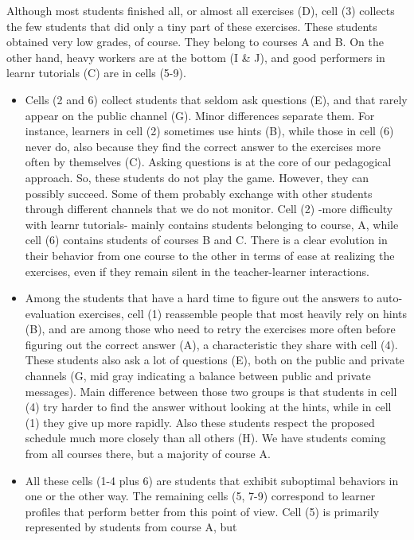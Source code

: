 \documentclass{aims}
\theoremstyle{definition}
\begin{document}
Although most students finished all, or almost all exercises (D), cell
(3) collects the few students that did only a tiny part of these
exercises. These students obtained very low grades, of course. They
belong to courses A and B. On the other hand, heavy workers are at the
bottom (I \& J), and good performers in learnr tutorials (C) are in
cells (5-9).

\begin{itemize}
\item
  Cells (2 and 6) collect students that seldom ask questions (E), and
  that rarely appear on the public channel (G). Minor differences
  separate them. For instance, learners in cell (2) sometimes use hints
  (B), while those in cell (6) never do, also because they find the
  correct answer to the exercises more often by themselves (C). Asking
  questions is at the core of our pedagogical approach. So, these
  students do not play the game. However, they can possibly succeed.
  Some of them probably exchange with other students through different
  channels that we do not monitor. Cell (2) -more difficulty with learnr
  tutorials- mainly contains students belonging to course, A, while cell
  (6) contains students of courses B and C. There is a clear evolution
  in their behavior from one course to the other in terms of ease at
  realizing the exercises, even if they remain silent in the
  teacher-learner interactions.
\item
  Among the students that have a hard time to figure out the answers to
  auto-evaluation exercises, cell (1) reassemble people that most
  heavily rely on hints (B), and are among those who need to retry the
  exercises more often before figuring out the correct answer (A), a
  characteristic they share with cell (4). These students also ask a lot
  of questions (E), both on the public and private channels (G, mid gray
  indicating a balance between public and private messages). Main
  difference between those two groups is that students in cell (4) try
  harder to find the answer without looking at the hints, while in cell
  (1) they give up more rapidly. Also these students respect the
  proposed schedule much more closely than all others (H). We have
  students coming from all courses there, but a majority of course A.
\item
  All these cells (1-4 plus 6) are students that exhibit suboptimal
  behaviors in one or the other way. The remaining cells (5, 7-9)
  correspond to learner profiles that perform better from this point of
  view. Cell (5) is primarily represented by students from course A, but

\end{itemize}
\end{document}
